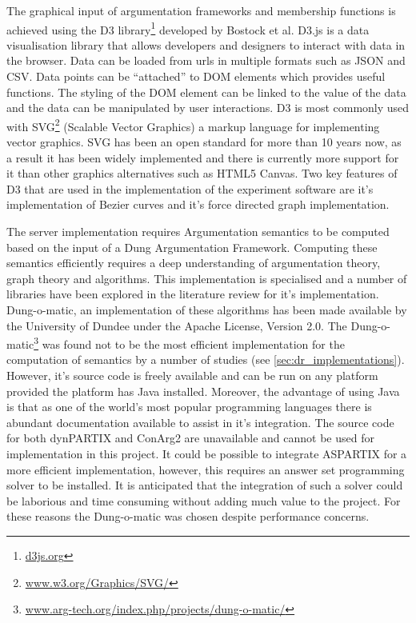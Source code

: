 The graphical input of argumentation frameworks and membership functions is achieved using the  D3 library\footnote{\url{d3js.org}} developed by Bostock et al.\cite{2011-d3} D3.js is a data visualisation library that allows developers and designers to interact with data in the browser. Data can be loaded from urls in multiple formats such as JSON and CSV. Data points can be ``attached'' to DOM elements which provides useful functions. The styling of the DOM element can be linked to the value of the data and the data can be manipulated by user interactions. D3 is most commonly used with SVG\footnote{\url{www.w3.org/Graphics/SVG/}} (Scalable Vector Graphics) a markup language for implementing vector graphics. SVG has been an open standard for more than 10 years now, as a result it has been widely implemented and there is currently more support for it than other graphics alternatives such as HTML5 Canvas. Two key features of D3 that are used in the implementation of the experiment software are it's implementation of Bezier curves and it's force directed graph implementation.

The server implementation requires Argumentation semantics to be computed based on the input of a Dung Argumentation Framework. Computing these semantics efficiently requires a deep understanding of argumentation theory, graph theory and algorithms. This implementation is specialised and a number of libraries have been explored in the literature review for it's implementation. Dung-o-matic, an implementation of these algorithms has been made available by the University of Dundee under the Apache License, Version 2.0. The Dung-o-matic\footnote{\url{www.arg-tech.org/index.php/projects/dung-o-matic/}} was found not to be the most efficient implementation for the computation of semantics by a number of studies (see \ref{sec:dr_implementations}). However, it's source code is freely available and can be run on any platform provided the platform has Java installed. Moreover, the advantage of using Java is that as one of the world's most popular programming languages there is abundant documentation available to assist in it's integration. The source code for both dynPARTIX and ConArg2 are unavailable and cannot be used for implementation in this project. It could be possible to integrate ASPARTIX for a more efficient implementation, however, this requires an answer set programming solver to be installed. It is anticipated that the integration of such a solver could be laborious and time consuming without adding much value to the project. For these reasons the Dung-o-matic was chosen despite performance concerns.

